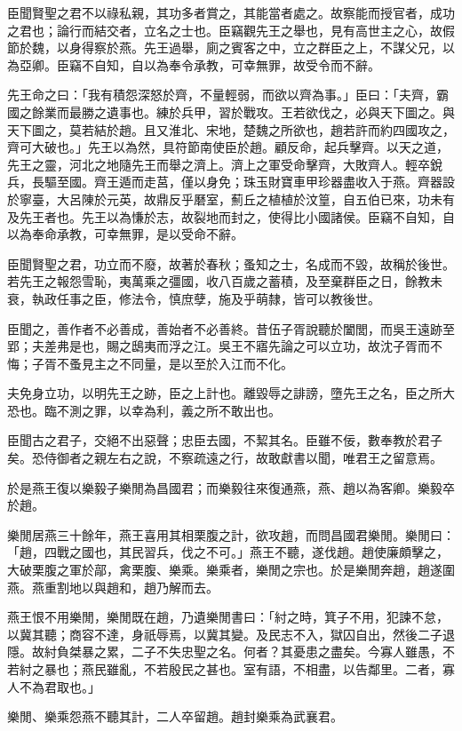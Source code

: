 \begin{pinyinscope}
臣聞賢聖之君不以祿私親，其功多者賞之，其能當者處之。故察能而授官者，成功之君也；論行而結交者，立名之士也。臣竊觀先王之舉也，見有高世主之心，故假節於魏，以身得察於燕。先王過舉，廁之賓客之中，立之群臣之上，不謀父兄，以為亞卿。臣竊不自知，自以為奉令承教，可幸無罪，故受令而不辭。

先王命之曰：「我有積怨深怒於齊，不量輕弱，而欲以齊為事。」臣曰：「夫齊，霸國之餘業而最勝之遺事也。練於兵甲，習於戰攻。王若欲伐之，必與天下圖之。與天下圖之，莫若結於趙。且又淮北、宋地，楚魏之所欲也，趙若許而約四國攻之，齊可大破也。」先王以為然，具符節南使臣於趙。顧反命，起兵擊齊。以天之道，先王之靈，河北之地隨先王而舉之濟上。濟上之軍受命擊齊，大敗齊人。輕卒銳兵，長驅至國。齊王遁而走莒，僅以身免；珠玉財寶車甲珍器盡收入于燕。齊器設於寧臺，大呂陳於元英，故鼎反乎磿室，薊丘之植植於汶篁，自五伯已來，功未有及先王者也。先王以為慊於志，故裂地而封之，使得比小國諸侯。臣竊不自知，自以為奉命承教，可幸無罪，是以受命不辭。

臣聞賢聖之君，功立而不廢，故著於春秋；蚤知之士，名成而不毀，故稱於後世。若先王之報怨雪恥，夷萬乘之彊國，收八百歲之蓄積，及至棄群臣之日，餘教未衰，執政任事之臣，修法令，慎庶孽，施及乎萌隸，皆可以教後世。

臣聞之，善作者不必善成，善始者不必善終。昔伍子胥說聽於闔閭，而吳王遠跡至郢；夫差弗是也，賜之鴟夷而浮之江。吳王不寤先論之可以立功，故沈子胥而不悔；子胥不蚤見主之不同量，是以至於入江而不化。

夫免身立功，以明先王之跡，臣之上計也。離毀辱之誹謗，墮先王之名，臣之所大恐也。臨不測之罪，以幸為利，義之所不敢出也。

臣聞古之君子，交絕不出惡聲；忠臣去國，不絜其名。臣雖不佞，數奉教於君子矣。恐侍御者之親左右之說，不察疏遠之行，故敢獻書以聞，唯君王之留意焉。

於是燕王復以樂毅子樂閒為昌國君；而樂毅往來復通燕，燕、趙以為客卿。樂毅卒於趙。

樂閒居燕三十餘年，燕王喜用其相栗腹之計，欲攻趙，而問昌國君樂閒。樂閒曰：「趙，四戰之國也，其民習兵，伐之不可。」燕王不聽，遂伐趙。趙使廉頗擊之，大破栗腹之軍於鄗，禽栗腹、樂乘。樂乘者，樂閒之宗也。於是樂閒奔趙，趙遂圍燕。燕重割地以與趙和，趙乃解而去。

燕王恨不用樂閒，樂閒既在趙，乃遺樂閒書曰：「紂之時，箕子不用，犯諫不怠，以冀其聽；商容不達，身祇辱焉，以冀其變。及民志不入，獄囚自出，然後二子退隱。故紂負桀暴之累，二子不失忠聖之名。何者？其憂患之盡矣。今寡人雖愚，不若紂之暴也；燕民雖亂，不若殷民之甚也。室有語，不相盡，以告鄰里。二者，寡人不為君取也。」

樂閒、樂乘怨燕不聽其計，二人卒留趙。趙封樂乘為武襄君。


\end{pinyinscope}
